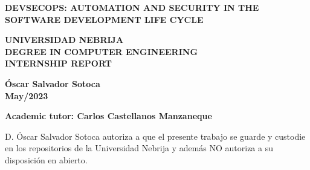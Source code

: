 \documentclass[11pt]{article}
\begin{document}
		\begin{titlepage}
		{\color{white}{.}}
		\linebreak
		\linebreak
		
		\centering
		\linebreak
		\vspace{3cm}
		
		{\LARGE\textbf{\color{RojoNebrija}DEVSECOPS: AUTOMATION AND SECURITY IN THE SOFTWARE DEVELOPMENT LIFE CYCLE}\par}
		\vspace{2cm}
		
		{\Large \textbf{\color{black}UNIVERSIDAD NEBRIJA \\ DEGREE IN COMPUTER ENGINEERING \\ INTERNSHIP REPORT}\par}
		\vspace{2cm}
		

		{\Large \textbf{ Óscar Salvador Sotoca\\ May/2023}\par}
		\vspace{2cm}

		{\Large \textbf{Academic tutor: Carlos Castellanos Manzaneque}\par}
		\vspace{2cm}
						
	\end{titlepage}

\setcounter{page}{3}
    \clearpage
    \begin{flushleft}
    D. Óscar Salvador Sotoca autoriza a que el presente trabajo se guarde y custodie en los repositorios de la Universidad Nebrija y además NO autoriza a su disposición en abierto.
    \end{flushleft}
    \clearpage 
    

\tableofcontents

\clearpage
\listoffigures


\end{document}

